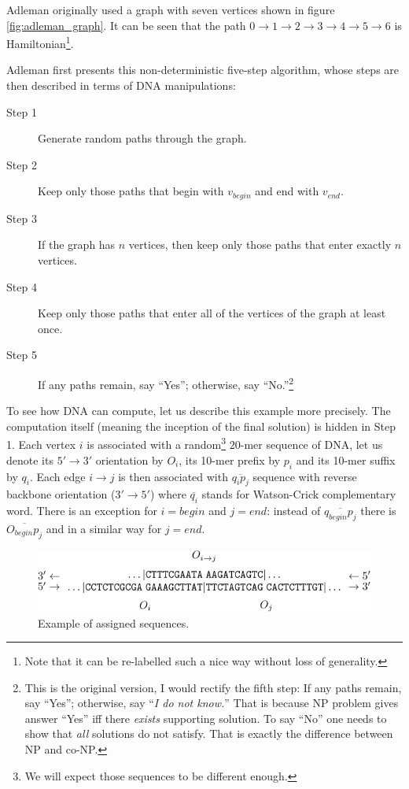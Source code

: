 	Adleman originally used a graph with seven vertices shown in figure \ref{fig:adleman_graph}. It can be seen that the path $0 \rightarrow 1 \rightarrow 2 \rightarrow 3 \rightarrow 4 \rightarrow 5 \rightarrow 6$ is Hamiltonian\footnote{Note that it can be re-labelled such a nice way without loss of generality.}.
	
	Adleman first presents this non-deterministic five-step algorithm, whose steps are then described in terms of DNA manipulations:
	\begin{description}
		\item[Step 1] Generate random paths through the graph.
		\item[Step 2] Keep only those paths that begin with $v_{begin}$ and end with $v_{end}$.
		\item[Step 3] If the graph has $n$ vertices, then keep only those paths that enter exactly $n$ vertices.
		\item[Step 4] Keep only those paths that enter all of the vertices of the graph at least once.
		\item[Step 5] If any paths remain, say ``Yes''; otherwise, say ``No.''\footnote{This is the original version, I would rectify the fifth step: If any paths remain, say ``Yes''; otherwise, say ``{\em I do not know.}'' That is because NP problem gives answer ``Yes'' iff there {\em exists} supporting solution. To say ``No'' one needs to show that {\em all} solutions do not satisfy. That is exactly the difference between NP and co-NP.} %
	\end{description}
	To see %
	how DNA can compute, let us describe this example more precisely. The computation itself (meaning the inception of the final solution) is hidden in Step 1. Each vertex $i$ is associated with a random\footnote{We will expect those sequences to be different enough.} $20$-mer sequence of DNA, let us denote its $5'\rightarrow 3'$ orientation by $O_i$, its 10-mer prefix by $p_i$ and its 10-mer suffix by $q_i$. Each edge $i\rightarrow j$ is then associated with $\overline{q_i p_j}$ sequence with reverse backbone orientation ($3'\rightarrow 5'$) where $\overline{q_i}$ stands for Watson-Crick complementary word. There is an exception for $i=begin$ and $j=end$: instead of $\overline{q_{begin} p_j}$ there is $\overline{O_{begin} p_j}$ and in a similar way for $j=end$.
	
	\begin{figure}[H]
	\begin{center}
		\includegraphics{./figures/adleman_strands.pdf}
		\caption{Example of assigned sequences.}
		\label{fig:adleman_strands}
	\end{center}
	\end{figure}
	
